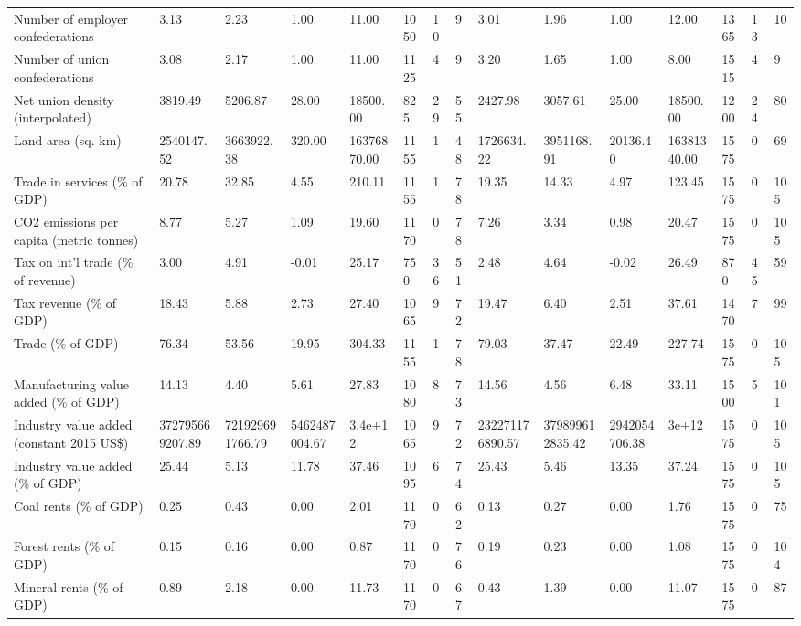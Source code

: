 \begin{longtable}{lllllllllllllll}
Number of employer confederations & 3.13 & 2.23 & 1.00 & 11.00 & 1050 & 10 & 9 & 3.01 & 1.96 & 1.00 & 12.00 & 1365 & 13 & 10\\
Number of union confederations & 3.08 & 2.17 & 1.00 & 11.00 & 1125 & 4 & 9 & 3.20 & 1.65 & 1.00 & 8.00 & 1515 & 4 & 9\\
Net union density (interpolated) & 3819.49 & 5206.87 & 28.00 & 18500.00 & 825 & 29 & 55 & 2427.98 & 3057.61 & 25.00 & 18500.00 & 1200 & 24 & 80\\
Land area (sq. km) & 2540147.52 & 3663922.38 & 320.00 & 16376870.00 & 1155 & 1 & 48 & 1726634.22 & 3951168.91 & 20136.40 & 16381340.00 & 1575 & 0 & 69\\
\addlinespace
Trade in services (\% of GDP) & 20.78 & 32.85 & 4.55 & 210.11 & 1155 & 1 & 78 & 19.35 & 14.33 & 4.97 & 123.45 & 1575 & 0 & 105\\
CO2 emissions per capita (metric tonnes) & 8.77 & 5.27 & 1.09 & 19.60 & 1170 & 0 & 78 & 7.26 & 3.34 & 0.98 & 20.47 & 1575 & 0 & 105\\
Tax on int'l trade (\% of revenue) & 3.00 & 4.91 & -0.01 & 25.17 & 750 & 36 & 51 & 2.48 & 4.64 & -0.02 & 26.49 & 870 & 45 & 59\\
Tax revenue (\% of GDP) & 18.43 & 5.88 & 2.73 & 27.40 & 1065 & 9 & 72 & 19.47 & 6.40 & 2.51 & 37.61 & 1470 & 7 & 99\\
Trade (\% of GDP) & 76.34 & 53.56 & 19.95 & 304.33 & 1155 & 1 & 78 & 79.03 & 37.47 & 22.49 & 227.74 & 1575 & 0 & 105\\
\addlinespace
Manufacturing value added (\% of GDP) & 14.13 & 4.40 & 5.61 & 27.83 & 1080 & 8 & 73 & 14.56 & 4.56 & 6.48 & 33.11 & 1500 & 5 & 101\\
Industry value added (constant 2015 US\$) & 372795669207.89 & 721929691766.79 & 5462487004.67 & 3.4e+12 & 1065 & 9 & 72 & 232271176890.57 & 379899612835.42 & 2942054706.38 & 3e+12 & 1575 & 0 & 105\\
Industry value added (\% of GDP) & 25.44 & 5.13 & 11.78 & 37.46 & 1095 & 6 & 74 & 25.43 & 5.46 & 13.35 & 37.24 & 1575 & 0 & 105\\
Coal rents (\% of GDP) & 0.25 & 0.43 & 0.00 & 2.01 & 1170 & 0 & 62 & 0.13 & 0.27 & 0.00 & 1.76 & 1575 & 0 & 75\\
Forest rents (\% of GDP) & 0.15 & 0.16 & 0.00 & 0.87 & 1170 & 0 & 76 & 0.19 & 0.23 & 0.00 & 1.08 & 1575 & 0 & 104\\
\addlinespace
Mineral rents (\% of GDP) & 0.89 & 2.18 & 0.00 & 11.73 & 1170 & 0 & 67 & 0.43 & 1.39 & 0.00 & 11.07 & 1575 & 0 & 87\\

\end{longtable}
